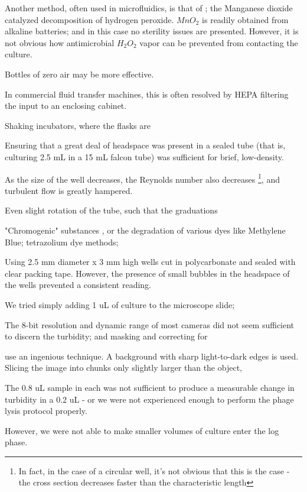 \documentclass[paper.tex]{subfiles}
\begin{document}
Another method, often used in microfluidics\cite{Microfluidic}, is that of \cite{method1951}; the Manganese dioxide catalyzed decomposition of hydrogen peroxide. $MnO_2$ is readily obtained from alkaline batteries; and in this case no sterility issues are presented. However, it is not obvious how antimicrobial $H_2O_2$ vapor can be prevented from contacting the culture.

Bottles of zero air may be more effective.

In commercial fluid transfer machines, this is often resolved by HEPA filtering the input to an enclosing cabinet.

Shaking incubators, where the flasks are 

Ensuring that a great deal of headspace was present in a sealed tube (that is, culturing 2.5 mL in a 15 mL falcon tube) was sufficient for brief, low-density.



As the size of the well decreases, the Reynolds number also decreases \footnote{In fact, in the case of a circular well, it's not obvious that this is the case - the cross section decreases faster than the characteristic length}, and turbulent flow is greatly hampered.

Even slight rotation of the tube, such that the graduations 

"Chromogenic" substances \cite{Fluorogenic1991}, or the degradation of various dyes like Methylene Blue; tetrazolium dye methods;

Using 2.5 mm diameter x 3 mm high wells cut in polycarbonate and sealed with clear packing tape. However, the presence of small bubbles in the headspace of the wells prevented a consistent reading.

We tried simply adding 1 uL of culture to the microscope slide;

The 8-bit resolution and dynamic range of most cameras did not seem sufficient to discern the turbidity; and masking and correcting for 

\cite{Vision2016} use an ingenious technique. A background with sharp light-to-dark edges is used. Slicing the image into chunks only slightly larger than the object,


The 0.8 uL sample in each was not sufficient to produce a measurable change in turbidity in a 0.2 uL - or we were not experienced enough to perform the phage lysis protocol properly.

However, we were not able to make smaller volumes of culture enter the log phase.
\end{document}

